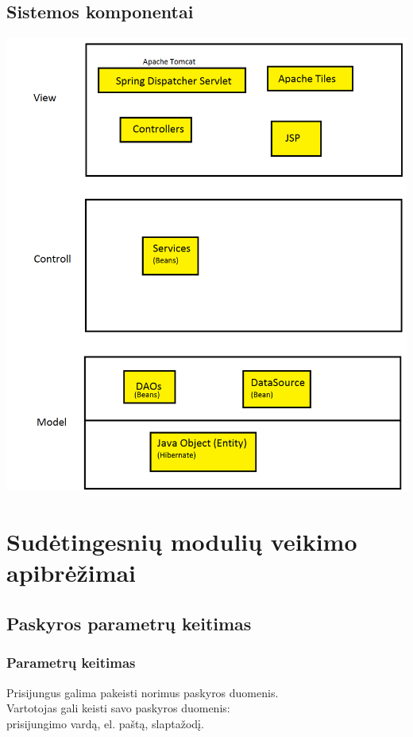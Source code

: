 \documentclass[a4paper,12pt]{article}
\begin{document}
\subsection{Sistemos komponentai}
\includegraphics[scale=0.5]{architektura2}


\section{Sudėtingesnių modulių veikimo apibrėžimai}

\subsection{ Paskyros parametrų keitimas }

\subsubsection{Parametrų keitimas}
Prisijungus galima pakeisti norimus paskyros duomenis.\\
Vartotojas gali keisti savo paskyros duomenis: \\
	prisijungimo vardą, el. paštą, slaptažodį. \\\\
	
\end{document}
